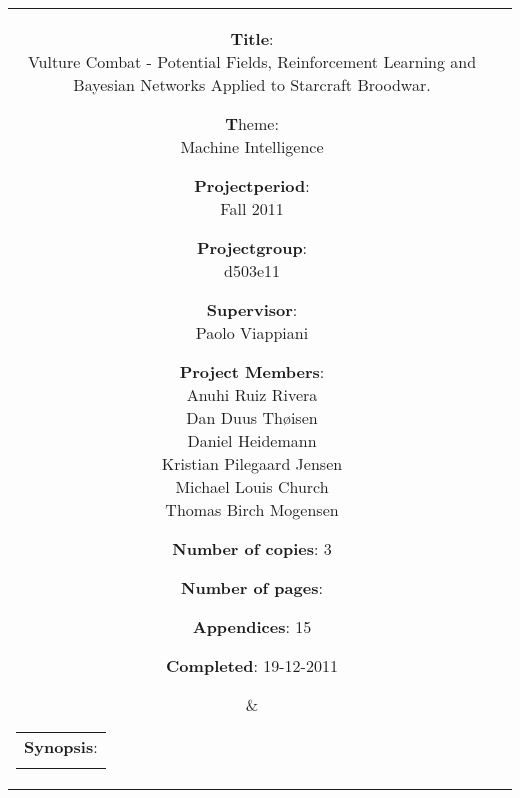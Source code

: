 	\begin{tabular}{cc}
		\parbox[0.1cm]{7cm}{ %
			\begin{description}
				\item {\textbf{Title}:} \\
					Vulture Combat - Potential Fields, Reinforcement Learning and Bayesian Networks Applied to Starcraft Broodwar.
				\item {\textbf Theme:} \\
					Machine Intelligence
 			\end{description}

			\parbox{8cm}{ %
				\begin{description}
					\item {\textbf{Projectperiod}:}\\
					Fall 2011\\
					\hspace{4cm}
					\item {\textbf{Projectgroup}:}\\
					d503e11\\
					\hspace{4cm}
					\item {\textbf{Supervisor}:}\\
					Paolo Viappiani \\
					\item {\textbf{Project Members}:}\\ \newcommand{\sh}{18pt} %
					Anuhi Ruiz Rivera \\
					Dan Duus Thøisen \\
					Daniel Heidemann \\
					Kristian Pilegaard Jensen \\
					Michael Louis Church \\
					Thomas Birch Mogensen \\
				\end{description}
			}
			\begin{description}
				\item {\textbf{Number of copies}:} 3
				\item {\textbf{Number of pages}:} \pageref{LastPage}
				\item {\textbf{Appendices}:} 15
				\item {\textbf{Completed}:} 19-12-2011
			\end{description}
			\vfill 
		} &
		\parbox{7cm}{ %
			\hfill %
			\begin{tabular}{l}%
				{\textbf{Synopsis}:}\bigskip \\%
				\fbox{ %
					\parbox{6.5cm}{\bigskip %
					{\vfill{\small %
					 
						\bigskip}}%
					}}%
			\end{tabular}%
		}
	\end{tabular}
	\\ \\

